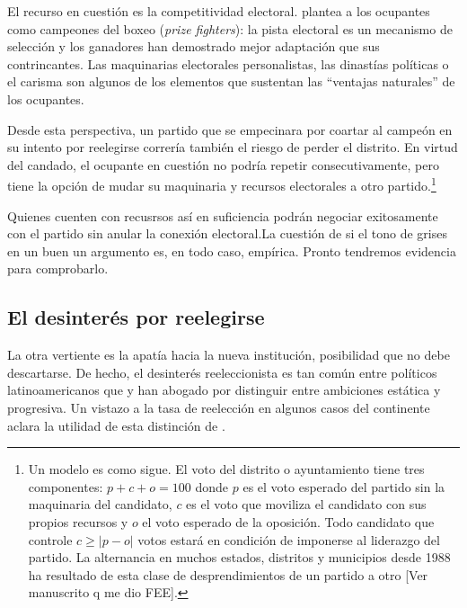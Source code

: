 \documentclass[letter,12pt]{article}
\begin{document}
El recurso en cuestión es la competitividad electoral. \citet{zallerprizeFighters} plantea a los ocupantes como campeones del boxeo (\emph{prize fighters}): la pista electoral es un mecanismo de selección y los ganadores han demostrado mejor adaptación que sus contrincantes. Las maquinarias electorales personalistas, las dinastías políticas o el carisma son algunos de los elementos que sustentan las ``ventajas naturales'' de los ocupantes.

Desde esta perspectiva, un partido que se empecinara por coartar al campeón en su intento por reelegirse correría también el riesgo de perder el distrito. En virtud del candado, el ocupante en cuestión no podría repetir consecutivamente, pero tiene la opción de mudar su maquinaria y recursos electorales a otro partido.\footnote{Un modelo es como sigue. El voto del distrito o ayuntamiento tiene tres componentes: $p + c + o = 100$ donde $p$ es el voto esperado del partido sin la maquinaria del candidato, $c$ es el voto que moviliza el candidato con sus propios recursos y $o$ el voto esperado de la oposición. Todo candidato que controle $c \ge |p-o|$ votos estará en condición de imponerse al liderazgo del partido. La alternancia en muchos estados, distritos y municipios desde 1988 ha resultado de esta clase de desprendimientos de un partido a otro [Ver manuscrito q me dio FEE].}

Quienes cuenten con recusrsos así en suficiencia podrán negociar exitosamente con el partido sin anular la conexión electoral.La cuestión de si el tono de grises en un buen un argumento es, en todo caso, empírica. Pronto tendremos evidencia para comprobarlo. 

\subsection{El desinterés por reelegirse}

\noindent La otra vertiente es la apatía hacia la nueva institución, posibilidad que no debe descartarse. De hecho, el desinterés reeleccionista es tan común entre políticos latinoamericanos que \citet{morgenstern.2002b} y \citet{micozziPhD2009} han abogado por distinguir entre ambiciones estática y progresiva. Un vistazo a la tasa de reelección en algunos casos del continente aclara la utilidad de esta distinción de \citet{schlesinger.1966}.
\end{document}
